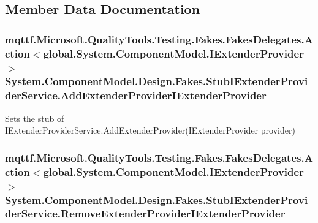\subsection{Member Data Documentation}
\hypertarget{class_system_1_1_component_model_1_1_design_1_1_fakes_1_1_stub_i_extender_provider_service_a822f1f25d47123dc17ba27b070c2d22a}{
\subsubsection[{Add\-Extender\-Provider\-I\-Extender\-Provider}]{\setlength{\rightskip}{0pt plus 5cm}mqttf.\-Microsoft.\-Quality\-Tools.\-Testing.\-Fakes.\-Fakes\-Delegates.\-Action$<$global.\-System.\-Component\-Model.\-I\-Extender\-Provider$>$ System.\-Component\-Model.\-Design.\-Fakes.\-Stub\-I\-Extender\-Provider\-Service.\-Add\-Extender\-Provider\-I\-Extender\-Provider}}\label{class_system_1_1_component_model_1_1_design_1_1_fakes_1_1_stub_i_extender_provider_service_a822f1f25d47123dc17ba27b070c2d22a}


Sets the stub of I\-Extender\-Provider\-Service.\-Add\-Extender\-Provider(\-I\-Extender\-Provider provider)

\hypertarget{class_system_1_1_component_model_1_1_design_1_1_fakes_1_1_stub_i_extender_provider_service_a3a2d3c70011252b4e2556dcaf6d28147}{
\subsubsection[{Remove\-Extender\-Provider\-I\-Extender\-Provider}]{\setlength{\rightskip}{0pt plus 5cm}mqttf.\-Microsoft.\-Quality\-Tools.\-Testing.\-Fakes.\-Fakes\-Delegates.\-Action$<$global.\-System.\-Component\-Model.\-I\-Extender\-Provider$>$ System.\-Component\-Model.\-Design.\-Fakes.\-Stub\-I\-Extender\-Provider\-Service.\-Remove\-Extender\-Provider\-I\-Extender\-Provider}}\label{class_system_1_1_component_model_1_1_design_1_1_fakes_1_1_stub_i_extender_provider_service_a3a2d3c70011252b4e2556dcaf6d28147}


